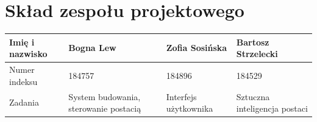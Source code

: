 \section{Skład zespołu projektowego}
\begin{center}
  \begin{tabular}{ | m{10em} || m{10em} | m{10em} | m{10em} | }
  \hline
    Imię i nazwisko & Bogna Lew & Zofia Sosińska & Bartosz Strzelecki \\
  \hline\hline
    Numer indeksu & 184757 & 184896 & 184529 \\
  \hline
    Zadania & System budowania, sterowanie postacią & Interfejs użytkownika & Sztuczna inteligencja postaci\\
  \hline
  \end{tabular}
\end{center}
